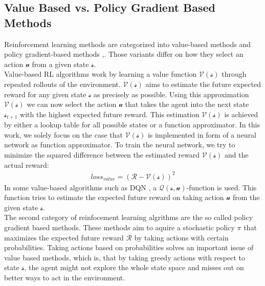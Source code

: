 \subsection*{Value Based vs. Policy Gradient Based Methods}\label{value_policy_based_methods}
Reinforcement learning methods are categorized into value-based methods and policy gradient-based methods \cite{tdlearning},\cite{policygradient}. Those variants differ on how they select an action $\mathcal{u}$ from a given state $\mathcal{s}$.\\
Value-based RL algorithms work by learning a value function $\mathcal{V(s)}$ through repeated rollouts of the environment. $\mathcal{V(s)}$ aims to estimate the future expected reward for any given state $\mathcal{s}$ as precisely as possible. Using this approximation $\mathcal{V(s)}$ we can now select the action $\mathcal{u}$ that takes the agent into the next state $\mathcal{s}_{t+1}$ with the highest expected future reward. This estimation $\mathcal{V(s)}$ is achieved by either a lookup table for all possible states or a function approximator. In this work, we solely focus on the case that $\mathcal{V(s)}$ is implemented in form of a neural network as function approximator. To train the neural network, we try to minimize the squared difference between the estimated reward $\mathcal{V(s)}$ and the actual reward:
\begin{gather*}
loss_{value}=(\mathcal{R}-\mathcal{V(s)})^2
\end{gather*}
In some value-based algorithms such as DQN \cite{mnih2013playing}, a $\mathcal{Q(s,u)}$-function is used. This function tries to estimate the expected future reward on taking action $\mathcal{u}$ from the given state $\mathcal{s}$.\\
The second category of reinfocement learning algrithms are the so called policy gradient based methods. These methods aim to aquire a stochastic policy $\pi$ that maximizes the expected future reward $\mathcal{R}$ by taking actions with certain probabilities. Taking actions based on probabilities solves an important issue of value based methods, which is, that by taking greedy actions with respect to state  $\mathcal{s}$, the agent might not explore the whole state space and misses out on better ways to act in the environment.

